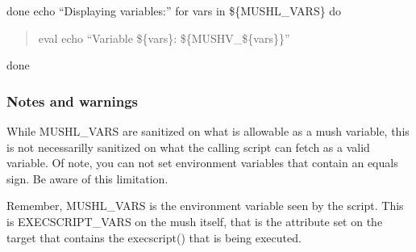 \documentclass[letterpaper,10pt,english]{sphinxmanual}
\begin{document}
\sphinxAtStartPar
done
echo “Displaying variables:”
for vars in \$\{MUSHL\_VARS\}
do
\begin{quote}

\sphinxAtStartPar
eval echo “Variable \$\{vars\}: \$\{MUSHV\_\$\{vars\}\}”
\end{quote}

\sphinxAtStartPar
done


\subsubsection{Notes and warnings}
\label{\detokenize{advanced:notes-and-warnings}}
\sphinxAtStartPar
While MUSHL\_VARS are sanitized on what is allowable as a mush variable, this
is not necessarilly sanitized on what the calling script can fetch as a valid
variable.  Of note, you can not set environment variables that contain an
equals sign.  Be aware of this limitation.

\sphinxAtStartPar
Remember, MUSHL\_VARS is the environment variable seen by the script.
This is EXECSCRIPT\_VARS on the mush itself, that is the attribute set
on the target that contains the execscript() that is being executed.
\end{document}
